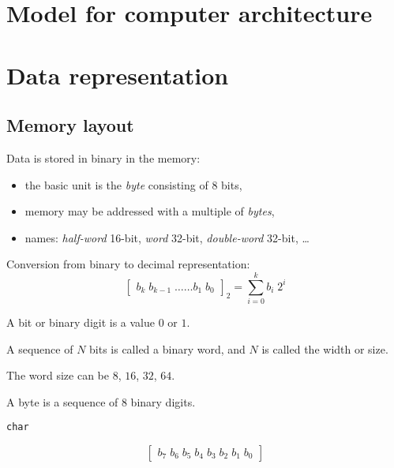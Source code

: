 \documentclass{article}
\begin{document}
\section{Model for computer architecture}

\section{Data representation}

\subsection{Memory layout}

Data is stored in binary in the memory:
\begin{itemize}
\item the basic unit is the \textit{byte} consisting of 8 bits,
\item memory may be addressed with a multiple of \textit{bytes},
\item names: \textit{half-word} 16-bit, \textit{word} 32-bit, \textit{double-word} 32-bit, \dots
\end{itemize}

\medskip
Conversion from binary to decimal representation:
\begin{equation*}
\begin{bmatrix}b_k\;b_{k-1}\;\dots\dots b_1\;b_0 \end{bmatrix}_2 = \sum^{k}_{i = 0} b_i\;2^i
\end{equation*}

A bit or binary digit is a value $0$ or $1$.

A sequence of $N$ bits is called a binary word, and $N$ is called the width or size.

The word size can be $8$, $16$, $32$, $64$.

A byte is a sequence of 8 binary digits.

\texttt{char}

\begin{equation*}
\begin{bmatrix}b_7\;b_6\;b_5\;b_4\;b_3\;b_2\;b_1\;b_0 \end{bmatrix}
\end{equation*}
\end{document}
